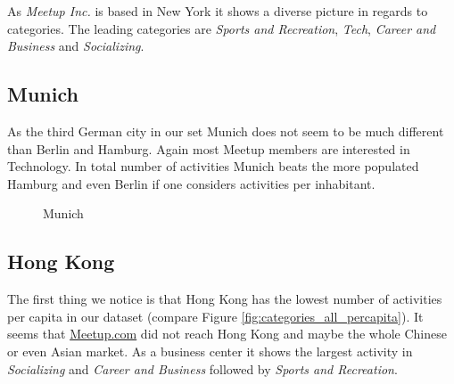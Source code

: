 As \emph{Meetup Inc.} is based in New York it shows a diverse picture in regards to categories. The leading categories are \emph{Sports and Recreation}, \emph{Tech}, \emph{Career and Business} and \emph{Socializing}. 

\subsection*{Munich}

As the third German city in our set Munich does not seem to be much different than Berlin and Hamburg. Again most Meetup members are interested in Technology. In total number of activities Munich beats the more populated Hamburg and even Berlin if one considers activities per inhabitant. 

\begin{figure}[!htp]
	\hfill
	\caption{Munich}
\end{figure}

\subsection*{Hong Kong}

The first thing we notice is that Hong Kong has the lowest number of activities per capita in our dataset (compare Figure \ref{fig:categories_all_percapita}). It seems that \url{Meetup.com} did not reach Hong Kong and maybe the whole Chinese or even Asian market. 
As a business center it shows the largest activity in \emph{Socializing} and \emph{Career and Business} followed by \emph{Sports and Recreation}. 

